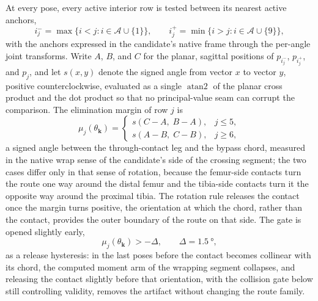 At every pose, every active interior row is tested between its nearest active anchors,
\begin{equation}
i^{-}_{j} = \max\{i < j : i \in \mathcal{A} \cup \{1\}\}, \qquad
i^{+}_{j} = \min\{i > j : i \in \mathcal{A} \cup \{9\}\},
\label{eq:app_anchors}
\end{equation}
with the anchors expressed in the candidate's native frame through the per-angle joint transforms. Write $A$, $B$, and $C$ for the planar, sagittal positions of $p_{i^{-}_{j}}$, $p_{i^{+}_{j}}$, and $p_{j}$, and let $s(x, y)$ denote the signed angle from vector $x$ to vector $y$, positive counterclockwise, evaluated as a single $\operatorname{atan2}$ of the planar cross product and the dot product so that no principal-value seam can corrupt the comparison. The elimination margin of row $j$ is
\begin{equation}
\mu_{j}(\theta_{\mathbf{k}}) =
\begin{cases}
s\!\left(C - A,\; B - A\right), & j \leq 5,\\[4pt]
s\!\left(A - B,\; C - B\right), & j \geq 6,
\end{cases}
\label{eq:app_elim_margin}
\end{equation}
a signed angle between the through-contact leg and the bypass chord, measured in the native wrap sense of the candidate's side of the crossing segment; the two cases differ only in that sense of rotation, because the femur-side contacts turn the route one way around the distal femur and the tibia-side contacts turn it the opposite way around the proximal tibia. The rotation rule releases the contact once the margin turns positive, the orientation at which the chord, rather than the contact, provides the outer boundary of the route on that side. The gate is opened slightly early,
\begin{equation}
\mu_{j}(\theta_{\mathbf{k}}) > -\Delta, \qquad \Delta = \qty{1.5}{\degree},
\label{eq:app_rotation_gate}
\end{equation}
as a release hysteresis: in the last poses before the contact becomes collinear with its chord, the computed moment arm of the wrapping segment collapses, and releasing the contact slightly before that orientation, with the collision gate below still controlling validity, removes the artifact without changing the route family.

